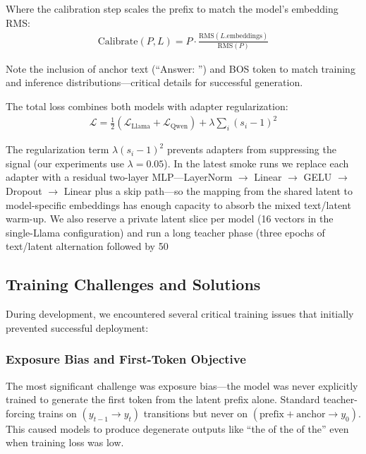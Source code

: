 \documentclass{article}
\begin{document}
Where the calibration step scales the prefix to match the model's embedding RMS:
\begin{align}
\text{Calibrate}(P, L) = P \cdot \frac{\text{RMS}(L.\text{embeddings})}{\text{RMS}(P)}
\end{align}

Note the inclusion of anchor text (``Answer: '') and BOS token to match training and inference distributions—critical details for successful generation.

The total loss combines both models with adapter regularization:
\begin{align}
\mathcal{L} = \frac{1}{2}(\mathcal{L}_{\text{Llama}} + \mathcal{L}_{\text{Qwen}}) + \lambda \sum_i (s_i - 1)^2
\end{align}

The regularization term $\lambda(s_i - 1)^2$ prevents adapters from suppressing the signal (our experiments use $\lambda=0.05$). In the latest smoke runs we replace each adapter with a residual two-layer MLP—LayerNorm $\rightarrow$ Linear $\rightarrow$ GELU $\rightarrow$ Dropout $\rightarrow$ Linear plus a skip path—so the mapping from the shared latent to model-specific embeddings has enough capacity to absorb the mixed text/latent warm-up. We also reserve a private latent slice per model (16 vectors in the single-Llama configuration) and run a long teacher phase (three epochs of text/latent alternation followed by 50%

\subsection{Training Challenges and Solutions}

During development, we encountered several critical training issues that initially prevented successful deployment:

\subsubsection{Exposure Bias and First-Token Objective}

The most significant challenge was exposure bias—the model was never explicitly trained to generate the first token from the latent prefix alone. Standard teacher-forcing trains on $(y_{t-1} \rightarrow y_t)$ transitions but never on $(\text{prefix} + \text{anchor} \rightarrow y_0)$. This caused models to produce degenerate outputs like ``the of the of the'' even when training loss was low.
\end{document}
